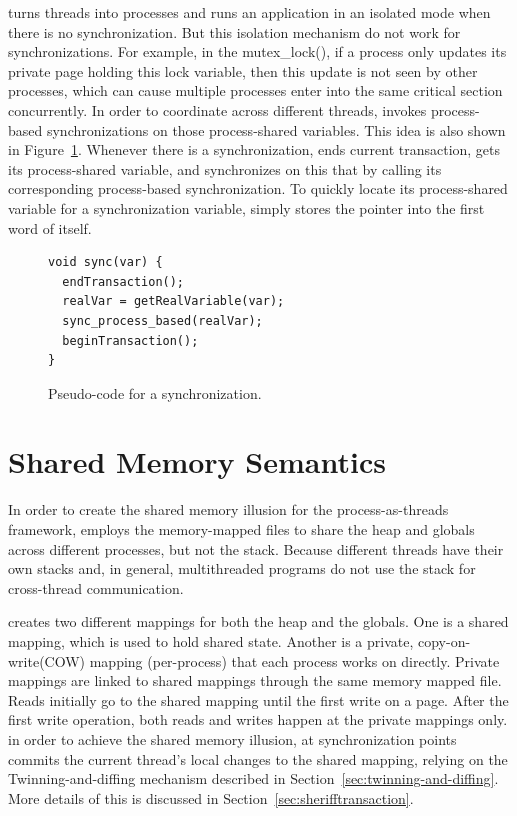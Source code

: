 \sheriff{} turns threads into processes and runs an application in an isolated mode when there is no synchronization. But this isolation mechanism do not work for synchronizations. For example, in the mutex\_lock(), if a process only updates its private page holding this lock variable, then this update is not seen by other processes, which can cause multiple processes enter into the same critical section concurrently. In order to coordinate across different threads, \sheriff{} invokes process-based synchronizations on those process-shared variables. This idea is also shown in Figure~\ref{fig:synccode}. Whenever there is a synchronization, \sheriff{} ends current transaction, gets its process-shared variable, and synchronizes on this that by calling its corresponding process-based synchronization. To quickly locate its process-shared variable for a synchronization variable, \sheriff{} simply stores the pointer into the first word of itself. 
 
\begin{figure}[!t]
\small
\begin{lstlisting}[style=tt]
void sync(var) {
  endTransaction();
  realVar = getRealVariable(var);
  sync_process_based(realVar);	
  beginTransaction();
}
\end{lstlisting}
\caption{Pseudo-code for a synchronization.\label{fig:synccode}}
\end{figure}

\section{Shared Memory Semantics}
\label{sec:sharedmemory}

In order to create the shared memory illusion for the process-as-threads framework, \sheriff{} employs the memory-mapped files to share the heap and globals across different processes, but not the stack. Because different threads
have their own stacks and, in general, multithreaded programs
do not use the stack for cross-thread communication.

\sheriff{} creates two different mappings for both the heap and the globals. One is a shared mapping, which is used to hold shared state. Another is a private, copy-on-write(COW) mapping (per-process) that each process works on directly.
Private mappings are linked to shared mappings through the same memory mapped file. Reads initially go to the shared mapping until the first write on a page. After the first write operation, both reads and writes happen at the private mappings only. in order to achieve the shared memory illusion, at synchronization points \sheriff{} commits the current thread's local changes to the shared mapping, relying on the Twinning-and-diffing mechanism described in Section~\ref{sec:twinning-and-diffing}. More details of this is discussed in Section~\ref{sec:sherifftransaction}.


